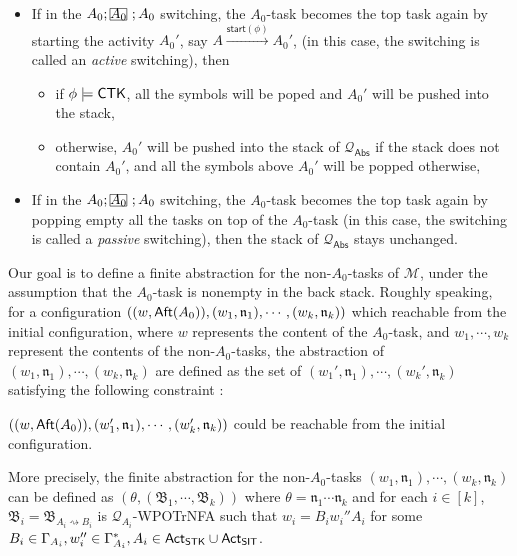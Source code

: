 \documentclass[preprint,12pt]{elsarticle}
\newcommand\rectangled[1]{\tikz[baseline=(torect.base)]{
    \node[shape = rectangle, draw, inner sep=0pt, outer sep = 0pt] (torect) {#1}
    }
}
\newcommand{\mrectangled}[1]{\text{\rectangled{\ensuremath{#1}}}}
\newcommand{\mhcancel}[1]{\mrectangled{#1}}
\newcommand\Mm{{\mathcal{M} }}
\newcommand\Qq{{\mathcal{Q} }}
\newcommand\act{{\sf Act}}
\newcommand\aft{{\sf Aft}}
\newcommand\ctkflag{{\sf CTK}}
\newcommand\startactivity{{\mathsf{start} }}
\newcommand\abs{{\mathsf{Abs} }}
\newcommand\aname{\mathfrak{n}}
\newcommand{\STK}{\mathsf{STK}}
\newcommand{\SIT}{\mathsf{SIT}}
\newcommand\AutB{{\mathfrak{B} }}
\newcommand{\WOTrNFA}{\textsf{WPOTrNFA}}
\begin{document}
{\begin{itemize}
    \item If in the $A_0; \mhcancel{A_0}; A_0$ switching, the $A_0$-task becomes the top task again by starting the activity $A_0'$, say $A\xrightarrow{\startactivity(\phi)}A_0'$, (in this case, the switching is called an \emph{active} switching), then
    \begin{itemize}
        \item if $\phi \models \ctkflag$, all the symbols will be poped and $A_0'$ will be pushed into the stack,
        \item otherwise, $A_0'$ will be pushed into the stack of  $\Qq_{\abs}$ if the stack does not contain $A_0'$, and all the symbols above $A_0'$ will be popped otherwise,
    \end{itemize}
%
    \item If in the $A_0; \mhcancel{A_0}; A_0$ switching, the $A_0$-task becomes the top task again by popping empty all the tasks on top of the $A_0$-task (in this case, the switching is called a \emph{passive} switching), then the stack of $\Qq_{\abs}$ stays unchanged.
        
\end{itemize}

Our goal is to define a finite abstraction for the non-$A_0$-tasks of $\Mm$, under the assumption that the $A_0$-task is nonempty in the back stack. 
Roughly speaking, for a configuration $((w,\aft(A_0)),(w_1,\aname_1),\cdots,(w_k,\aname_k))$ which reachable from the initial configuration, where $w$ represents the content of the $A_0$-task, and $w_1,\cdots,w_k$ represent the contents of the non-$A_0$-tasks, the abstraction of $(w_1,\aname_1),\cdots,(w_k,\aname_k)$ are defined as the set of $(w_1',\aname_1),\cdots,(w_k',\aname_k)$ satisfying the following constraint :
\begin{center}
$((w,\aft(A_0)),(w_1',\aname_1),\cdots,(w_k',\aname_k))$ could be reachable from the initial configuration.
\end{center}
More precisely, the finite abstraction for the non-$A_0$-tasks $(w_1,\aname_1),\cdots,(w_k,\aname_k)$ can be defined as $(\theta,(\AutB_1,\cdots,\AutB_k))$ where $\theta = \aname_1\cdots\aname_k$ and for each $i\in[k]$, $\AutB_i = \AutB_{A_i\rightsquigarrow B_i}$ is $\Qq_{A_i}$-{\WOTrNFA} such that $w_i = B_iw_i''A_i$ for some $B_i\in\Gamma_{A_i}, w_i''\in\Gamma_{A_i}^*, A_i\in\act_{\STK}\cup\act_{\SIT}$.

}
\end{document}

